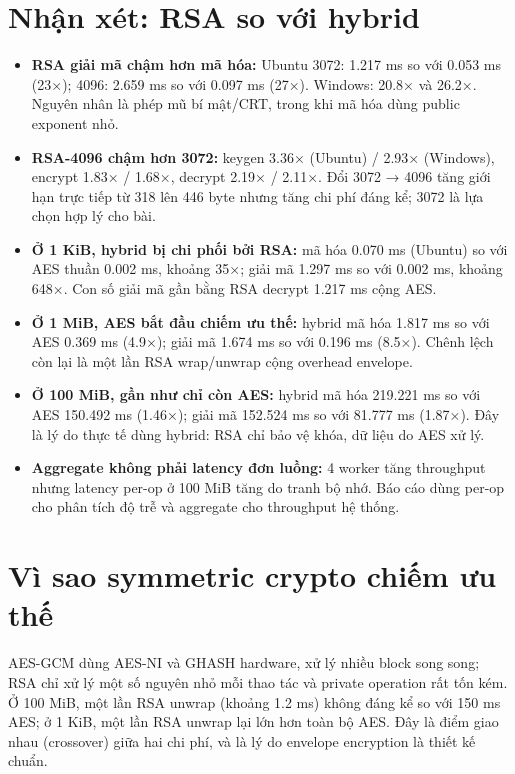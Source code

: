 \documentclass[12pt,a4paper,oneside]{report}
\begin{document}
\section{Nhận xét: RSA so với hybrid}


\begin{itemize}[leftmargin=*]
\item \textbf{RSA giải mã chậm hơn mã hóa:} Ubuntu 3072: 1.217 ms so với 0.053 ms (23×); 4096: 2.659 ms so với 0.097 ms (27×). Windows: 20.8× và 26.2×. Nguyên nhân là phép mũ bí mật/CRT, trong khi mã hóa dùng public exponent nhỏ.
\item \textbf{RSA-4096 chậm hơn 3072:} keygen 3.36× (Ubuntu) / 2.93× (Windows), encrypt 1.83× / 1.68×, decrypt 2.19× / 2.11×. Đổi 3072 → 4096 tăng giới hạn trực tiếp từ 318 lên 446 byte nhưng tăng chi phí đáng kể; 3072 là lựa chọn hợp lý cho bài.
\item \textbf{Ở 1 KiB, hybrid bị chi phối bởi RSA:} mã hóa 0.070 ms (Ubuntu) so với AES thuần 0.002 ms, khoảng 35×; giải mã 1.297 ms so với 0.002 ms, khoảng 648×. Con số giải mã gần bằng RSA decrypt 1.217 ms cộng AES.
\item \textbf{Ở 1 MiB, AES bắt đầu chiếm ưu thế:} hybrid mã hóa 1.817 ms so với AES 0.369 ms (4.9×); giải mã 1.674 ms so với 0.196 ms (8.5×). Chênh lệch còn lại là một lần RSA wrap/unwrap cộng overhead envelope.
\item \textbf{Ở 100 MiB, gần như chỉ còn AES:} hybrid mã hóa 219.221 ms so với AES 150.492 ms (1.46×); giải mã 152.524 ms so với 81.777 ms (1.87×). Đây là lý do thực tế dùng hybrid: RSA chỉ bảo vệ khóa, dữ liệu do AES xử lý.
\item \textbf{Aggregate không phải latency đơn luồng:} 4 worker tăng throughput nhưng latency per-op ở 100 MiB tăng do tranh bộ nhớ. Báo cáo dùng per-op cho phân tích độ trễ và aggregate cho throughput hệ thống.
\end{itemize}


\section{Vì sao symmetric crypto chiếm ưu thế}


AES-GCM dùng AES-NI và GHASH hardware, xử lý nhiều block song song; RSA chỉ xử lý một số nguyên nhỏ mỗi thao tác và private operation rất tốn kém. Ở 100 MiB, một lần RSA unwrap (khoảng 1.2 ms) không đáng kể so với 150 ms AES; ở 1 KiB, một lần RSA unwrap lại lớn hơn toàn bộ AES. Đây là điểm giao nhau (crossover) giữa hai chi phí, và là lý do envelope encryption là thiết kế chuẩn.
\end{document}

